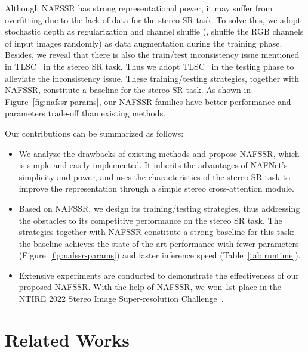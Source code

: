 \documentclass[10pt,twocolumn,letterpaper]{article}
\begin{document}
Although NAFSSR has strong representational power, it may suffer from overfitting due to the lack of data for the stereo SR task. To solve this, we adopt stochastic depth\cite{huang2016deep} as regularization and channel shuffle (\ie, shuffle the RGB channels of input images randomly) as data augmentation during the training phase. Besides, we reveal that there is also the train/test inconsistency issue mentioned in TLSC~\cite{chu2021tlsc} in the stereo SR task. Thus we adopt TLSC~\cite{chu2021tlsc} in the testing phase to alleviate the inconsistency issue. These training/testing strategies, together with NAFSSR, constitute a baseline for the stereo SR task. As shown in Figure~\ref{fig:nafssr-params}, our NAFSSR families have better performance and parameters trade-off than existing methods.

Our contributions can be summarized as follows:
\begin{itemize}
\vspace{-2mm}
	\item  We analyze the drawbacks of existing methods and propose NAFSSR, which is simple and easily implemented. It inherits the advantages of NAFNet's simplicity and power, and uses the characteristics of the stereo SR task to improve the representation through a simple stereo cross-attention module.
\vspace{-2mm}
	\item  Based on NAFSSR, we design its training/testing strategies, thus addressing the obstacles to its competitive performance on the stereo SR task. The strategies together with NAFSSR constitute a strong baseline for this task: the baseline achieves the state-of-the-art performance with fewer parameters (Figure~\ref{fig:nafssr-params}) and faster inference speed (Table~\ref{tab:runtime}).
\vspace{-2mm}
    \item Extensive experiments are conducted to demonstrate the effectiveness of our proposed NAFSSR. With the help of NAFSSR, we won 1st place in the NTIRE 2022 Stereo Image Super-resolution Challenge~\cite{Wang2022NTIRE}.
\end{itemize}
 \section{Related Works}
\end{document}
